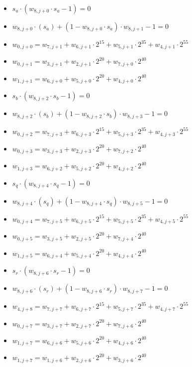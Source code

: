 \begin{itemize}
\item  $s_a \cdot (w_{8, j + 0} \cdot s_a - 1) = 0$
\item $w_{8, j + 0} \cdot (s_a) + (1 - w_{8, j + 0} \cdot s_a) \cdot w_{8, j + 1} - 1 = 0$
\item $w_{0, j + 0} = w_{7, j + 1} + w_{6, j + 1} \cdot 2^{15} + w_{5, j + 1} \cdot 2^{35} + w_{4, j + 1} \cdot 2^{55}$
\item $w_{0, j + 1} = w_{3, j + 1} + w_{2, j + 1} \cdot 2^{20} + w_{7, j + 0} \cdot 2^{40}$
\item $w_{1, j + 1} = w_{6, j + 0} + w_{5, j + 0} \cdot 2^{20} + w_{4, j + 0} \cdot 2^{40}$

\item  $s_b \cdot (w_{8, j + 2} \cdot s_b - 1) = 0$
\item $w_{8, j + 2} \cdot (s_b) + (1 - w_{8, j + 2} \cdot s_b) \cdot w_{8, j + 3} - 1 = 0$
\item $w_{0, j + 2} = w_{7, j + 3} + w_{6, j + 3} \cdot 2^{15} + w_{5, j + 3} \cdot 2^{35} + w_{4, j + 3} \cdot 2^{55}$
\item $w_{0, j + 3} = w_{3, j + 3} + w_{2, j + 3} \cdot 2^{20} + w_{7, j + 2} \cdot 2^{40}$
\item $w_{1, j + 3} = w_{6, j + 2} + w_{5, j + 2} \cdot 2^{20} + w_{4, j + 2} \cdot 2^{40}$

\item  $s_q \cdot (w_{8, j + 4} \cdot s_q - 1) = 0$
\item $w_{8, j + 4} \cdot (s_q) + (1 - w_{8, j + 4} \cdot s_q) \cdot w_{8, j + 5} - 1 = 0$
\item $w_{0, j + 4} = w_{7, j + 5} + w_{6, j + 5} \cdot 2^{15} + w_{5, j + 5} \cdot 2^{35} + w_{4, j + 5} \cdot 2^{55}$
\item $w_{0, j + 5} = w_{3, j + 5} + w_{2, j + 5} \cdot 2^{20} + w_{7, j + 4} \cdot 2^{40}$
\item $w_{1, j + 5} = w_{6, j + 4} + w_{5, j + 4} \cdot 2^{20} + w_{4, j + 4} \cdot 2^{40}$

\item  $s_r \cdot (w_{8, j + 6} \cdot s_r - 1) = 0$
\item $w_{8, j + 6} \cdot (s_r) + (1 - w_{8, j + 6} \cdot s_r) \cdot w_{8, j + 7} - 1 = 0$
\item $w_{4, j + 8} = w_{7, j + 7} + w_{6, j + 7} \cdot 2^{15} + w_{5, j + 7} \cdot 2^{35} + w_{4, j + 7} \cdot 2^{55}$
\item $w_{0, j + 7} = w_{3, j + 7} + w_{2, j + 7} \cdot 2^{20} + w_{7, j + 6} \cdot 2^{40}$
\item $w_{1, j + 7} = w_{6, j + 6} + w_{5, j + 6} \cdot 2^{20} + w_{4, j + 6} \cdot 2^{40}$
\item $w_{1, j + 7} = w_{1, j + 6} + w_{2, j + 6} \cdot 2^{20} + w_{3, j + 6} \cdot 2^{40}$


\end{itemize}
